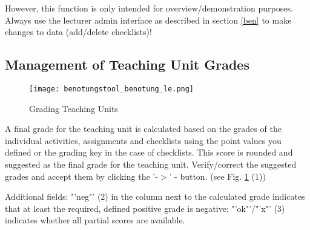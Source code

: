 However, this function is only intended for overview/demonstration purposes. Always use the lecturer admin interface as described in section \ref{ben} to make changes to data (add/delete checklists)!

\subsection {Management of Teaching Unit Grades}
\begin{figure}[ht]
\begin{center}
\texttt{[image: benotungstool\_benotung\_le.png]}
\end{center}
\caption{Grading Teaching Units}\label{benotung_le}
\end{figure}

A final grade for the teaching unit is calculated based on the grades of the individual activities, assignments and checklists using the point values you defined or the grading key in the case of checklists.
This score is rounded and suggested as the final grade for the teaching unit.
Verify/correct the suggested grades and accept them by clicking the '-$>$' - button.
(see Fig. \ref{benotung_le} (1))

Additional fields:
"'neg"' (2) in the column next to the calculated grade indicates that at least the required, defined positive grade is negative; "'ok"'/"'x"' (3) indicates whether all partial scores are available.

%
